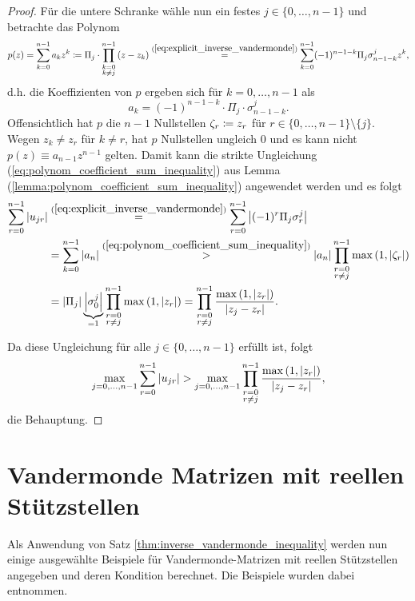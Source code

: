 \begin{proof}
    \noindent Für die untere Schranke wähle nun ein festes
    $j \in \{0, \dots, n-1\}$ und betrachte das Polynom
    \[
        p(z) = \sum_{k=0}^{n-1} a_k z^k
        \coloneqq \Pi_j \cdot \prod_{\substack{k=0\\ k \neq j}}^{n-1} \left( z - z_k \right)
        \overset{(\ref{eq:explicit_inverse_vandermonde})}{=} \sum_{k=0}^{n-1} (-1)^{n-1-k} \Pi_j \sigma_{n-1-k}^j z^k,
    \]
    d.h. die Koeffizienten von $p$ ergeben sich für $k = 0, \dots, n-1$ als
    \[
        a_k = (-1)^{n-1-k} \cdot \Pi_j \cdot \sigma_{n-1-k}^j.
    \]
    Offensichtlich hat $p$ die $n-1$ Nullstellen
    $\zeta_r \coloneqq z_r$ für $r \in \{0,\dots,n-1\} \setminus \{j\}$.
    Wegen $z_k \neq z_r$ für $k \neq r$, hat $p$ Nullstellen ungleich $0$ und
    es kann nicht $p(z) \equiv a_{n-1} z^{n-1}$ gelten.
    Damit kann die strikte Ungleichung
    (\ref{eq:polynom_coefficient_sum_inequality}) aus Lemma
    (\ref{lemma:polynom_coefficient_sum_inequality}) angewendet werden und es
    folgt
    \[
        \begin{split}
            \sum_{r=0}^{n-1} \left\lvert u_{jr} \right\rvert
            &\overset{(\ref{eq:explicit_inverse_vandermonde})}{=}
                \sum_{r=0}^{n-1} \left\lvert (-1)^r \Pi_j \sigma_r^j \right\rvert\\
            &= \sum_{k=0}^{n-1} \left\lvert a_n \right\rvert
            \overset{(\ref{eq:polynom_coefficient_sum_inequality})}{>}
                \left\lvert a_{n} \right\rvert \prod_{\substack{r=0\\ r \neq j}}^{n-1} \max \left(1, \left\lvert \zeta_r \right\rvert \right)\\
            &= \left\lvert \Pi_j \right\rvert \underbrace{\left\lvert \sigma_0^j \right\rvert}_{=1} \prod_{\substack{r=0\\ r \neq j}}^{n-1} \max \left(1, \left\lvert z_r \right\rvert \right)
            = \prod_{\substack{r=0\\ r \neq j}}^{n-1} \frac{\max \left(1, \left\lvert z_r \right\rvert \right)}{\left\lvert z_j - z_r \right\rvert}.
        \end{split}
    \]

    \noindent Da diese Ungleichung für alle $j \in \{0, \dots, n-1\}$ erfüllt ist, folgt
    \[
        \max_{j = 0, \dots, n-1} \sum_{r=0}^{n-1} \left\lvert u_{jr} \right\rvert
        > \max_{j = 0, \dots, n-1} \prod_{\substack{r=0\\ r \neq j}}^{n-1} \frac{\max \left(1, \left\lvert z_r \right\rvert \right)}{\left\lvert z_j - z_r \right\rvert},
    \]
    die Behauptung.
\end{proof}

\section{Vandermonde Matrizen mit reellen Stützstellen}
Als Anwendung von Satz \ref{thm:inverse_vandermonde_inequality} werden nun
einige ausgewählte Beispiele für Vandermonde-Matrizen mit reellen Stützstellen
angegeben und deren Kondition berechnet.
Die Beispiele wurden dabei \cite[S. 197-199]{gautschi1} entnommen.

